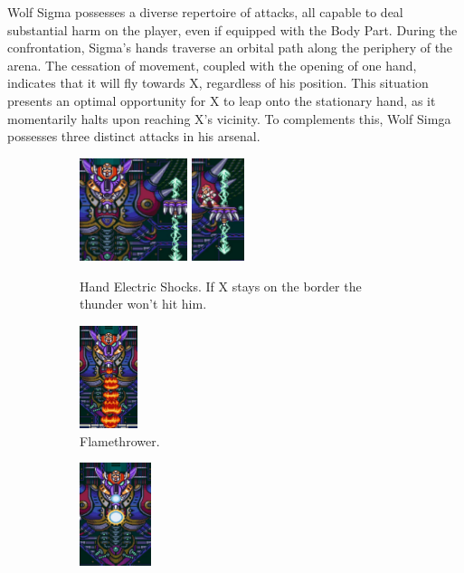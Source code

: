 Wolf Sigma possesses a diverse repertoire of attacks, all capable to deal substantial harm on the player, even if equipped with the Body Part. During the confrontation, Sigma's hands traverse an orbital path along the periphery of the arena. The cessation of movement, coupled with the opening of one hand, indicates that it will fly towards X, regardless of his position.  This situation presents an optimal opportunity for X to leap onto the stationary hand, as it momentarily halts upon reaching X's vicinity. To complements this, Wolf Simga possesses three distinct attacks in his arsenal.\begin{figure}[htp]
	\centering
	\begin{subfigure}{\linewidth}
		\centering
		\includegraphics[height=3cm]{figures/X1/Sigma_stages/WolfSigma_thunder.jpg}
		\includegraphics[height=3cm]{figures/X1/Sigma_stages/WolfSigma_thunder_2.jpg}
		\caption{Hand Electric Shocks. If X stays on the border the thunder won't hit him.}
	\end{subfigure}
	\begin{subfigure}{0.25\linewidth}
		\centering
		\includegraphics[height=3cm]{figures/X1/Sigma_stages/WolfSigma_fire.jpg}
		\caption{Flamethrower.}
	\end{subfigure}
	\begin{subfigure}{0.3\linewidth}
		\centering
		\includegraphics[height=3cm]{figures/X1/Sigma_stages/WolfSigma_plasma.jpg}

\end{subfigure}
\end{figure}
